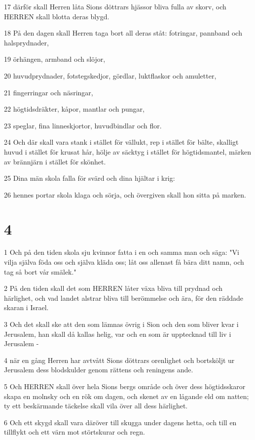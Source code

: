 \par 17 därför skall Herren låta Sions döttrars hjässor bliva fulla av skorv, och HERREN skall blotta deras blygd.
\par 18 På den dagen skall Herren taga bort all deras ståt: fotringar, pannband och halsprydnader,
\par 19 örhängen, armband och slöjor,
\par 20 huvudprydnader, fotstegskedjor, gördlar, luktflaskor och amuletter,
\par 21 fingerringar och näsringar,
\par 22 högtidsdräkter, kåpor, mantlar och pungar,
\par 23 speglar, fina linneskjortor, huvudbindlar och flor.
\par 24 Och där skall vara stank i stället för vällukt, rep i stället för bälte, skalligt huvud i stället för krusat hår, hölje av säcktyg i stället för högtidsmantel, märken av brännjärn i stället för skönhet.
\par 25 Dina män skola falla för svärd och dina hjältar i krig:
\par 26 hennes portar skola klaga och sörja, och övergiven skall hon sitta på marken.

\chapter{4}

\par 1 Och på den tiden skola sju kvinnor fatta i en och samma man och säga: "Vi vilja själva föda oss och själva kläda oss; låt oss allenast få bära ditt namn, och tag så bort vår smälek."
\par 2 På den tiden skall det som HERREN låter växa bliva till prydnad och härlighet, och vad landet alstrar bliva till berömmelse och ära, för den räddade skaran i Israel.
\par 3 Och det skall ske att den som lämnas övrig i Sion och den som bliver kvar i Jerusalem, han skall då kallas helig, var och en som är upptecknad till liv i Jerusalem -
\par 4 när en gång Herren har avtvått Sions döttrars orenlighet och bortsköljt ur Jerusalem dess blodskulder genom rättens och reningens ande.
\par 5 Och HERREN skall över hela Sions bergs område och över dess högtidsskaror skapa en molnsky och en rök om dagen, och skenet av en lågande eld om natten; ty ett beskärmande täckelse skall vila över all dess härlighet.
\par 6 Och ett skygd skall vara däröver till skugga under dagens hetta, och till en tillflykt och ett värn mot störtskurar och regn.


